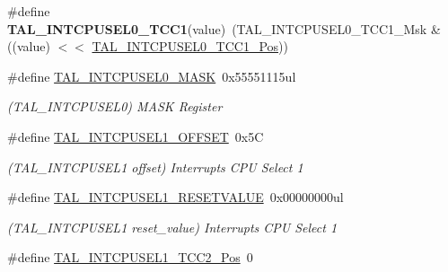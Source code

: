 \begin{DoxyCompactItemize}
\item 
\hypertarget{group___s_a_m_l21___t_a_l_ga2d92f6995e2e279cdbe4b907e136840e}{}\#define {\bfseries T\+A\+L\+\_\+\+I\+N\+T\+C\+P\+U\+S\+E\+L0\+\_\+\+T\+C\+C1}(value)~(T\+A\+L\+\_\+\+I\+N\+T\+C\+P\+U\+S\+E\+L0\+\_\+\+T\+C\+C1\+\_\+\+Msk \& ((value) $<$$<$ \hyperlink{group___s_a_m_l21___t_a_l_gae9fa0a724a12f0a7be36f0e91d35be8e}{T\+A\+L\+\_\+\+I\+N\+T\+C\+P\+U\+S\+E\+L0\+\_\+\+T\+C\+C1\+\_\+\+Pos}))\label{group___s_a_m_l21___t_a_l_ga2d92f6995e2e279cdbe4b907e136840e}

\item 
\hypertarget{group___s_a_m_l21___t_a_l_ga29f30076f78985f22549747fe7a9dd9a}{}\#define \hyperlink{group___s_a_m_l21___t_a_l_ga29f30076f78985f22549747fe7a9dd9a}{T\+A\+L\+\_\+\+I\+N\+T\+C\+P\+U\+S\+E\+L0\+\_\+\+M\+A\+S\+K}~0x55551115ul\label{group___s_a_m_l21___t_a_l_ga29f30076f78985f22549747fe7a9dd9a}

\begin{DoxyCompactList}\small\item\em (T\+A\+L\+\_\+\+I\+N\+T\+C\+P\+U\+S\+E\+L0) M\+A\+S\+K Register \end{DoxyCompactList}\item 
\hypertarget{group___s_a_m_l21___t_a_l_gaa77b9dbce02372f230932f632ddaa41d}{}\#define \hyperlink{group___s_a_m_l21___t_a_l_gaa77b9dbce02372f230932f632ddaa41d}{T\+A\+L\+\_\+\+I\+N\+T\+C\+P\+U\+S\+E\+L1\+\_\+\+O\+F\+F\+S\+E\+T}~0x5\+C\label{group___s_a_m_l21___t_a_l_gaa77b9dbce02372f230932f632ddaa41d}

\begin{DoxyCompactList}\small\item\em (T\+A\+L\+\_\+\+I\+N\+T\+C\+P\+U\+S\+E\+L1 offset) Interrupts C\+P\+U Select 1 \end{DoxyCompactList}\item 
\hypertarget{group___s_a_m_l21___t_a_l_ga054f9d15c38ffc07aca2c17d775b8f21}{}\#define \hyperlink{group___s_a_m_l21___t_a_l_ga054f9d15c38ffc07aca2c17d775b8f21}{T\+A\+L\+\_\+\+I\+N\+T\+C\+P\+U\+S\+E\+L1\+\_\+\+R\+E\+S\+E\+T\+V\+A\+L\+U\+E}~0x00000000ul\label{group___s_a_m_l21___t_a_l_ga054f9d15c38ffc07aca2c17d775b8f21}

\begin{DoxyCompactList}\small\item\em (T\+A\+L\+\_\+\+I\+N\+T\+C\+P\+U\+S\+E\+L1 reset\+\_\+value) Interrupts C\+P\+U Select 1 \end{DoxyCompactList}\item 
\hypertarget{group___s_a_m_l21___t_a_l_gafaae7927a323afa5070770fc69b87044}{}\#define \hyperlink{group___s_a_m_l21___t_a_l_gafaae7927a323afa5070770fc69b87044}{T\+A\+L\+\_\+\+I\+N\+T\+C\+P\+U\+S\+E\+L1\+\_\+\+T\+C\+C2\+\_\+\+Pos}~0\label{group___s_a_m_l21___t_a_l_gafaae7927a323afa5070770fc69b87044}


\end{DoxyCompactItemize}
